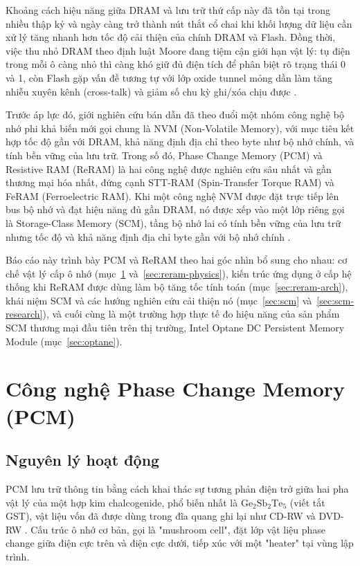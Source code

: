 \documentclass[12pt,a4paper]{article}
\begin{document}
Khoảng cách hiệu năng giữa DRAM và lưu trữ thứ cấp này đã tồn tại trong nhiều thập kỷ và ngày càng trở thành nút thắt cổ chai khi khối lượng dữ liệu cần xử lý tăng nhanh hơn tốc độ cải thiện của chính DRAM và Flash. Đồng thời, việc thu nhỏ DRAM theo định luật Moore đang tiệm cận giới hạn vật lý: tụ điện trong mỗi ô càng nhỏ thì càng khó giữ đủ điện tích để phân biệt rõ trạng thái 0 và 1, còn Flash gặp vấn đề tương tự với lớp oxide tunnel mỏng dần làm tăng nhiễu xuyên kênh (cross-talk) và giảm số chu kỳ ghi/xóa chịu được \cite{meena2014}.

Trước áp lực đó, giới nghiên cứu bán dẫn đã theo đuổi một nhóm công nghệ bộ nhớ phi khả biến mới gọi chung là NVM (Non-Volatile Memory), với mục tiêu kết hợp tốc độ gần với DRAM, khả năng định địa chỉ theo byte như bộ nhớ chính, và tính bền vững của lưu trữ. Trong số đó, Phase Change Memory (PCM) và Resistive RAM (ReRAM) là hai công nghệ được nghiên cứu sâu nhất và gần thương mại hóa nhất, đứng cạnh STT-RAM (Spin-Transfer Torque RAM) và FeRAM (Ferroelectric RAM). Khi một công nghệ NVM được đặt trực tiếp lên bus bộ nhớ và đạt hiệu năng đủ gần DRAM, nó được xếp vào một lớp riêng gọi là Storage-Class Memory (SCM), tầng bộ nhớ lai có tính bền vững của lưu trữ nhưng tốc độ và khả năng định địa chỉ byte gần với bộ nhớ chính \cite{kamath2019}.

Báo cáo này trình bày PCM và ReRAM theo hai góc nhìn bổ sung cho nhau: cơ chế vật lý cấp ô nhớ (mục~\ref{sec:pcm} và~\ref{sec:reram-physics}), kiến trúc ứng dụng ở cấp hệ thống khi ReRAM được dùng làm bộ tăng tốc tính toán (mục~\ref{sec:reram-arch}), khái niệm SCM và các hướng nghiên cứu cải thiện nó (mục~\ref{sec:scm} và~\ref{sec:scm-research}), và cuối cùng là một trường hợp thực tế đo hiệu năng của sản phẩm SCM thương mại đầu tiên trên thị trường, Intel Optane DC Persistent Memory Module (mục~\ref{sec:optane}).

\section{Công nghệ Phase Change Memory (PCM)}
\label{sec:pcm}

\subsection{Nguyên lý hoạt động}

PCM lưu trữ thông tin bằng cách khai thác sự tương phản điện trở giữa hai pha vật lý của một hợp kim chalcogenide, phổ biến nhất là $\mathrm{Ge_2Sb_2Te_5}$ (viết tắt GST), vật liệu vốn đã được dùng trong đĩa quang ghi lại như CD-RW và DVD-RW \cite{wong2010}. Cấu trúc ô nhớ cơ bản, gọi là "mushroom cell", đặt lớp vật liệu phase change giữa điện cực trên và điện cực dưới, tiếp xúc với một "heater" tại vùng lập trình.
\end{document}
